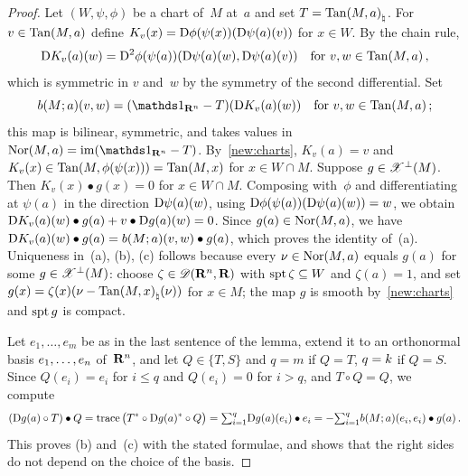\begin{proof}
    Let $(W,\psi,\phi)$ be a chart of~$M$ at~$a$ and set $T = {\operatorname{Tan}(M,a)}_\natural$. For $v \in
    \operatorname{Tan}(M,a)$ define $K_v(x) = \mathrm{D} \phi(\psi(x))(\mathrm{D} \psi(a)(v))$ for $x \in W$. By the chain
    rule,
    \begin{displaymath}
        \mathrm{D} K_v(a)(w) = \mathrm{D}^2 \phi(\psi(a))(\mathrm{D} \psi(a)(w), \mathrm{D} \psi(a)(v)) \quad \text{for $v, w
        \in \operatorname{Tan}(M,a)$} \,,
    \end{displaymath}
    which is symmetric in $v$ and~$w$ by the symmetry of the second differential. Set
    \begin{displaymath}
        b(M;a)(v,w) = (\id{\R^{\adim}} - T)(\uD K_v(a)(w)) \quad \text{for $v, w \in \Tan(M,a)$}
        \,;
    \end{displaymath}
    this map is bilinear, symmetric, and takes values in $\Nor(M,a) = \im (\id{\R^{\adim}} -
    T)$. By~\ref{new:charts}, $K_v(a) = v$ and $K_v(x) \in \operatorname{Tan}(M,\phi(\psi(x))) = \operatorname{Tan}(M,x)$
    for $x \in W \cap M$. Suppose $g \in \mathscr{X}^\perp(M)$. Then $K_v(x) \bullet g(x) = 0$ for $x \in
    W \cap M$. Composing with~$\phi$ and differentiating at $\psi(a)$ in the direction $\mathrm{D}
    \psi(a)(w)$, using $\mathrm{D} \phi(\psi(a))(\mathrm{D} \psi(a)(w)) = w$, we obtain $\mathrm{D} K_v(a)(w) \bullet
    g(a) + v \bullet \mathrm{D} g(a)(w) = 0$. Since $g(a) \in \operatorname{Nor}(M,a)$, we have $\mathrm{D} K_v(a)(w) \bullet
    g(a) = b(M;a)(v,w) \bullet g(a)$, which proves the identity of~(a). Uniqueness in~(a), (b),
    (c) follows because every $\nu \in \operatorname{Nor}(M,a)$ equals $g(a)$ for some $g \in
    \mathscr{X}^\perp(M)$: choose $\zeta \in \mathscr{D}(\mathbf{R}^{n},\mathbf{R})$ with $\operatorname{spt} \zeta \subseteq W$ and
    $\zeta(a) = 1$, and set $g(x) = \zeta(x) (\nu - {\operatorname{Tan}(M,x)}_\natural(\nu))$ for $x \in M$;
    the map $g$ is smooth by~\ref{new:charts} and $\operatorname{spt} g$ is compact.

    Let $e_1, \ldots, e_m$ be as in the last sentence of the lemma, extend it to an orthonormal
    basis $e_1, \ldots, e_{n}$ of~$\mathbf{R}^{n}$, and let $Q \in \{ T, S \}$ and $q = m$ if $Q
    = T$, $q = k$ if $Q = S$. Since $Q(e_i) = e_i$ for $i \le q$ and $Q(e_i) = 0$ for $i >
    q$, and $T \circ Q = Q$, we compute
    \begin{displaymath}
        (\mathrm{D} g(a) \circ T) \bullet Q = \operatorname{trace} \big( T^{*} \circ \mathrm{D} g(a)^{*} \circ
        Q \big) = {\textstyle\sum_{i=1}^{q}} \mathrm{D} g(a)(e_i) \bullet e_i = - {\textstyle\sum_{i=1}^{q}} b(M;a)(e_i,e_i)
        \bullet g(a) \,.
    \end{displaymath}
    This proves (b) and~(c) with the stated formulae, and shows that the right sides do not
    depend on the choice of the basis.
\end{proof}


